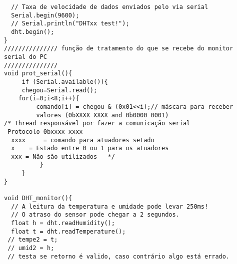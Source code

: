 \begin{verbatim}
  // Taxa de velocidade de dados enviados pelo via serial
  Serial.begin(9600);
  // Serial.println("DHTxx test!");
  dht.begin();
}
/////////////// função de tratamento do que se recebe do monitor
serial do PC
///////////////
void prot_serial(){
     if (Serial.available()){
     chegou=Serial.read();
    for(i=0;i<8;i++){
         comando[i] = chegou & (0x01<<i);// máscara para receber
         valores (0bXXXX XXXX and 0b0000 0001)
/* Thread responsável por fazer a comunicação serial
 Protocolo 0bxxxx xxxx
  xxxx     = comando para atuadores setado
  x    = Estado entre 0 ou 1 para os atuadores
  xxx = Não são utilizados   */
          }
     }
}

void DHT_monitor(){
  // A leitura da temperatura e umidade pode levar 250ms!
  // O atraso do sensor pode chegar a 2 segundos.
  float h = dht.readHumidity();
  float t = dht.readTemperature();
 // tempe2 = t;
 // umid2 = h;
 // testa se retorno é valido, caso contrário algo está errado.


\end{verbatim}
